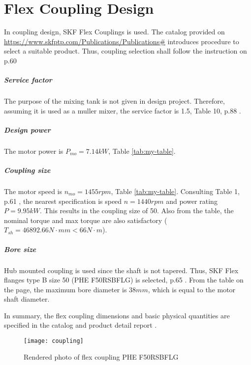 \chapter{Flex Coupling Design}

In coupling design, SKF Flex Couplings is used. The catalog provided on \url{https://www.skfptp.com/Publications/Publications#} introduces procedure to select a suitable product. Thus, coupling selection shall follow the instruction on p.60 \cite{skf_2018}

\paragraph{Service factor} The purpose of the mixing tank is not given in design project. Therefore, assuming it is used as a muller mixer, the service factor is 1.5, Table 10, p.88 \cite{skf_2018}.

\paragraph{Design power}
The motor power is $ P_{mo} = 7.14 \unit{kW} $, Table \ref{tab:my-table}.

\paragraph{Coupling size}
The motor speed is $ n_{mo} = 1455 \unit{rpm} $, Table \ref{tab:my-table}. Consulting Table 1, p.61 \cite{skf_2018}, the nearest specification is speed $ n = 1440 \unit{rpm} $ and power rating $ P = 9.95 \unit{kW} $. This results in the coupling size of 50. Also from the table, the nominal torque and max torque are also satisfactory ($ T_{sh} = 46892.66 \unit{N\cdot mm} < 66 \unit{N\cdot m}$).

\paragraph{Bore size}
Hub mounted coupling is used since the shaft is not tapered. Thus, SKF Flex flanges type B size 50 (PHE F50RSBFLG) is selected, p.65 \cite{skf_2018}. From the table on the page, the maximum bore diameter is $ 38\unit{mm} $, which is equal to the motor shaft diameter.

In summary, the flex coupling dimensions and basic physical quantities are specified in the catalog \cite{skf_2018} and product detail report \cite{bibid}.

\begin{figure}[ht]
	\centering
	\texttt{[image: coupling]}
	\caption{Rendered photo of flex coupling PHE F50RSBFLG}
	\label{coupling}
\end{figure}